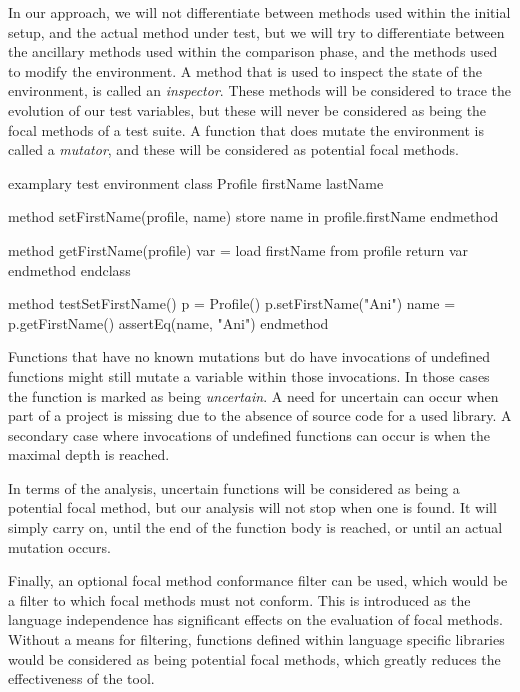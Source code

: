 \documentclass[11pt]{article}
\begin{document}
\begin{multicols}{2}
In our approach, we will not differentiate between methods used within the initial setup, and the actual method under test, but we will try to differentiate between the ancillary methods used within the comparison phase, and the methods used to modify the environment. A method that is used to inspect the state of the environment, is called an \textit{inspector}. These methods will be considered to trace the evolution of our test variables, but these will never be considered as being the focal methods of a test suite. A function that does mutate the environment is called a \textit{mutator}, and these will be considered as potential focal methods. 

\begin{sexylisting}{examplary test environment\label{lst:example1}}
class Profile
  firstName
  lastName
	
  method setFirstName(profile, name)
    store name in profile.firstName
  endmethod
	
  method getFirstName(profile)
    var = load firstName from profile
    return var
  endmethod
endclass
	
method testSetFirstName()
  p = Profile()
  p.setFirstName("Ani")
  name = p.getFirstName()
  assertEq(name, "Ani")
endmethod
\end{sexylisting}


Functions that have no known mutations but do have invocations of undefined functions might still mutate a variable within those invocations. In those cases the function is marked as being \textit{uncertain}. A need for uncertain can occur when part of a project is missing due to the absence of source code for a used library. A secondary case where invocations of undefined functions can occur is when the maximal depth is reached. 

In terms of the analysis, uncertain functions will be considered as being a potential focal method, but our analysis will not stop when one is found. It will simply carry on, until the end of the function body is reached, or until an actual mutation occurs.

Finally, an optional focal method conformance filter can be used, which would be a filter to which focal methods must not conform. This is introduced as the language independence has significant effects on the evaluation of focal methods. Without a means for filtering, functions defined within language specific libraries would be considered as being potential focal methods, which greatly reduces the effectiveness of the tool.


\end{multicols}
\end{document}
